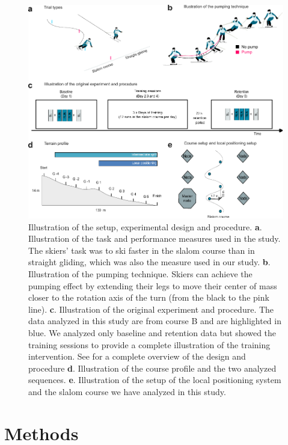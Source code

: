 \documentclass{article}
\begin{document}
\begin{figure}
    \centering
    \includegraphics[width=1\linewidth]{figurer/figure_design_5.pdf}
    \caption{Illustration of the setup, experimental design and procedure. \textbf{a}. Illustration of the task and performance measures used in the study. The skiers' task was to ski faster in the slalom course than in straight gliding, which was also the measure used in our study. \textbf{b}. Illustration of the pumping technique. Skiers can achieve the pumping effect by extending their legs to move their center of mass closer to the rotation axis of the turn (from the black to the pink line). \textbf{c}. Illustration of the original experiment and procedure. The data analyzed in this study are from course B and are highlighted in blue. We analyzed only baseline and retention data but showed the training sessions to provide a complete illustration of the training intervention. See \cite{magelssen_is_2022} for a complete overview of the design and procedure \textbf{d}. Illustration of the course profile and the two analyzed sequences. \textbf{e}. Illustration of the setup of the local positioning system and the slalom course we have analyzed in this study.}
    \label{fig: design}
\end{figure}

\section{Methods}
\end{document}
